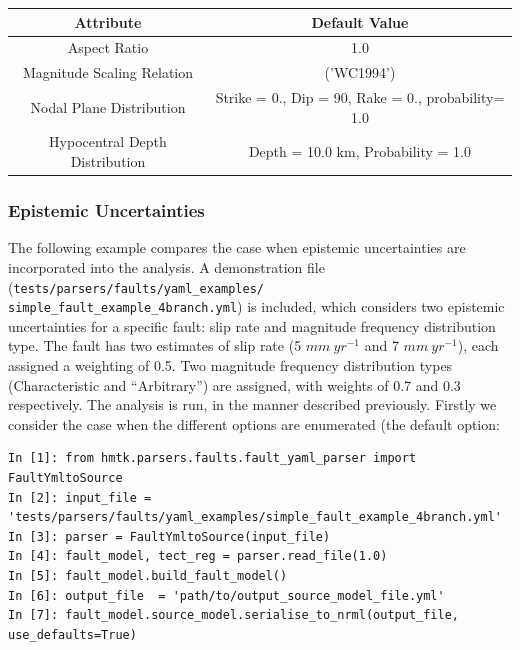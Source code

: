 \begin{table}[h]
\begin{tabular}{|c|c|} \hline
\textbf{Attribute} & \textbf{Default Value} \\ \hline
Aspect Ratio & 1.0 \\
Magnitude Scaling Relation & \cite{wells1994} ('WC1994') \\
Nodal Plane Distribution & Strike = 0., Dip = 90, Rake = 0., probability= 1.0\\
Hypocentral Depth Distribution & Depth = 10.0 km, Probability = 1.0 \\ \hline

\end{tabular}

\end{table}

\subsubsection{Epistemic Uncertainties}

The following example compares the case when epistemic uncertainties are incorporated into the analysis. A demonstration file (\verb=tests/parsers/faults/yaml_examples/=\\
\verb=simple_fault_example_4branch.yml=) is included, which considers two epistemic uncertainties for a specific fault: slip rate and magnitude frequency distribution type. The fault has two estimates of slip rate (5 $mm \ yr^{-1}$ and 7 $mm\ yr^{-1}$), each assigned a weighting of 0.5. Two magnitude frequency distribution types (Characteristic and \cite{AndersonLuco1983} ``Arbitrary'') are assigned, with weights of 0.7 and 0.3 respectively. The analysis is run, in the manner described previously. Firstly we consider the case when the different options are enumerated (the default option:

\begin{Verbatim}[frame=single, commandchars=\\\{\}, fontsize=\scriptsize]
In [1]: from hmtk.parsers.faults.fault_yaml_parser import FaultYmltoSource
In [2]: input_file = 'tests/parsers/faults/yaml_examples/simple_fault_example_4branch.yml'
In [3]: parser = FaultYmltoSource(input_file) 
In [4]: fault_model, tect_reg = parser.read_file(1.0)
In [5]: fault_model.build_fault_model()
In [6]: output_file  = 'path/to/output_source_model_file.yml'
In [7]: fault_model.source_model.serialise_to_nrml(output_file, use_defaults=True)
\end{Verbatim}

